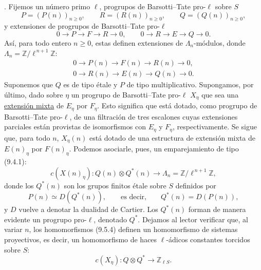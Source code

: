 
\medskip
{}. Fijemos un número primo $\ell$, progrupos de Barsotti--Tate
pro-$\ell$ sobre $S$
\begin{equation}\tag{9.5.1}
 P=(P(n))_{n\geq0},
 \qquad R=(R(n))_{n\geq0},
 \qquad Q=(Q(n))_{n\geq0},
\end{equation}
y extensiones de progrupos de Barsotti--Tate pro-$\ell$
\begin{equation}\tag{9.5.2}
 0\longrightarrow P\longrightarrow F\longrightarrow R\longrightarrow0,
 \qquad
 0\longrightarrow R\longrightarrow E\longrightarrow Q\longrightarrow0.
\end{equation}
Así, para todo entero $n\geq0$, estas definen extensiones de
$\Lambda_n$-módulos, donde
$\Lambda_n=\mathbb Z/\ell^{\,n+1}\mathbb Z$:
\begin{equation}\tag{9.5.3}
\begin{gathered}
 0\longrightarrow P(n)\longrightarrow F(n)\longrightarrow R(n)
 \longrightarrow0,\\
 0\longrightarrow R(n)\longrightarrow E(n)\longrightarrow Q(n)
 \longrightarrow0.
\end{gathered}
\end{equation}
Suponemos que $Q$ es de tipo étale y $P$ de tipo multiplicativo.
Supongamos, por último, dado sobre $\eta$ un progrupo de
Barsotti--Tate pro-$\ell$ $X_\eta$ que sea una \underline{extensión
mixta} de $E_\eta$ por $F_\eta$. Esto significa que está dotado, como
progrupo de Barsotti--Tate pro-$\ell$, de una filtración de tres
escalones cuyas extensiones parciales están provistas de isomorfismos con
$E_\eta$ y $F_\eta$, respectivamente. Se sigue que, para todo $n$,
$X_\eta(n)$ está dotado de una estructura de extensión mixta de
$E(n)_\eta$ por $F(n)_\eta$. Podemos asociarle, pues, un emparejamiento
de tipo (9.4.1):
\begin{equation}\tag{9.5.4}
 c(X(n)_\eta):Q(n)\otimes Q^*(n)
 \longrightarrow\Lambda_n=\mathbb Z/\ell^{\,n+1}\mathbb Z,
\end{equation}
donde los $Q^*(n)$ son los grupos finitos étale sobre $S$ definidos por
\begin{equation*}
 P(n)\simeq D(Q^*(n)),
 \qquad\text{es decir,}\qquad Q^*(n)=D(P(n)),
\end{equation*}
y $D$ vuelve a denotar la dualidad de Cartier. Los $Q^*(n)$ forman de
manera evidente un progrupo pro-$\ell$, denotado $Q^*$. Dejamos al
lector verificar que, al variar $n$, los homomorfismos (9.5.4) definen
un homomorfismo de sistemas proyectivos, es decir, un homomorfismo de
haces $\ell$-ádicos constantes torcidos sobre $S$:
\begin{equation}\tag{9.5.5}
 c(X_\eta):Q\otimes Q^*\longrightarrow\mathbb Z_{\ell S}.
\end{equation}

